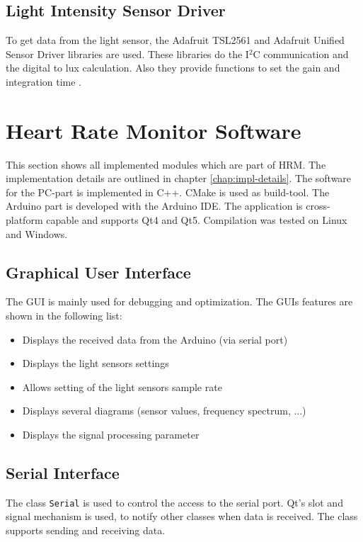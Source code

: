 \documentclass[notitlepage]{scrreprt}
\begin{document}
\subsection{Light Intensity Sensor Driver}
To get data from the light sensor, the Adafruit TSL2561 and Adafruit Unified Sensor Driver libraries are used. These libraries do the I$^{2}$C communication and the digital to lux calculation. Also they provide functions to set the gain and integration time \cite{bib:tsl-library} \cite{bib:sensor-library}.

\newpage

\section{Heart Rate Monitor Software}
This section shows all implemented modules which are part of HRM. The implementation details are outlined in chapter \ref{chap:impl-details}. The software for the PC-part is implemented in C++. CMake is used as build-tool. The Arduino part is developed with the Arduino IDE. The application is cross-platform capable and supports Qt4 and Qt5. Compilation was tested on Linux and Windows.

\subsection{Graphical User Interface}
The GUI is mainly used for debugging and optimization. The GUIs features are shown in the following list:

\begin{itemize}
	\item{Displays the received data from the Arduino (via serial port)}
	\item{Displays the light sensors settings}
	\item{Allows setting of the light sensors sample rate}
	\item{Displays several diagrams (sensor values, frequency spectrum, ...)}
	\item{Displays the signal processing parameter}
\end{itemize}

\subsection{Serial Interface}
The class \lstinline$Serial$ is used to control the access to the serial port. Qt's slot and signal mechanism is used, to notify other classes when data is received. The class supports sending and receiving data. 
\end{document}
